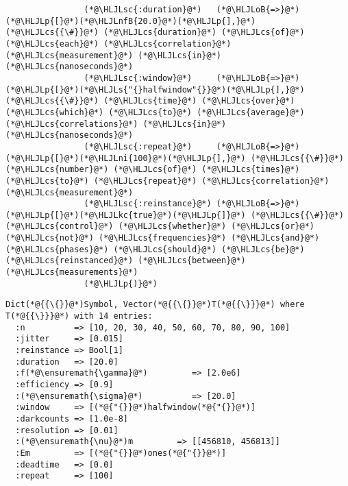 \documentclass[12pt,a4paper]{article}
\newcommand{\HLJLkc}[1]{\textcolor[RGB]{59,151,46}{\textit{#1}}}
\newcommand{\HLJLs}[1]{\textcolor[RGB]{201,61,57}{#1}}
\newcommand{\HLJLsc}[1]{\textcolor[RGB]{201,61,57}{#1}}
\newcommand{\HLJLnfB}[1]{\textcolor[RGB]{59,151,46}{#1}}
\newcommand{\HLJLni}[1]{\textcolor[RGB]{59,151,46}{#1}}
\newcommand{\HLJLoB}[1]{\textcolor[RGB]{102,102,102}{\textbf{#1}}}
\newcommand{\HLJLp}[1]{#1}
\newcommand{\HLJLcs}[1]{\textcolor[RGB]{153,153,119}{\textit{#1}}}
\begin{document}
\begin{lstlisting}
                (*@\HLJLsc{:duration}@*)   (*@\HLJLoB{=>}@*) (*@\HLJLp{[}@*)(*@\HLJLnfB{20.0}@*)(*@\HLJLp{],}@*) (*@\HLJLcs{{\#}}@*) (*@\HLJLcs{duration}@*) (*@\HLJLcs{of}@*) (*@\HLJLcs{each}@*) (*@\HLJLcs{correlation}@*) (*@\HLJLcs{measurement}@*) (*@\HLJLcs{in}@*) (*@\HLJLcs{nanoseconds}@*)
                (*@\HLJLsc{:window}@*)     (*@\HLJLoB{=>}@*) (*@\HLJLp{[}@*)(*@\HLJLs{"{}halfwindow"{}}@*)(*@\HLJLp{],}@*) (*@\HLJLcs{{\#}}@*) (*@\HLJLcs{time}@*) (*@\HLJLcs{over}@*) (*@\HLJLcs{which}@*) (*@\HLJLcs{to}@*) (*@\HLJLcs{average}@*) (*@\HLJLcs{correlations}@*) (*@\HLJLcs{in}@*) (*@\HLJLcs{nanoseconds}@*)
                (*@\HLJLsc{:repeat}@*)     (*@\HLJLoB{=>}@*) (*@\HLJLp{[}@*)(*@\HLJLni{100}@*)(*@\HLJLp{],}@*) (*@\HLJLcs{{\#}}@*) (*@\HLJLcs{number}@*) (*@\HLJLcs{of}@*) (*@\HLJLcs{times}@*) (*@\HLJLcs{to}@*) (*@\HLJLcs{repeat}@*) (*@\HLJLcs{correlation}@*) (*@\HLJLcs{measurement}@*)
                (*@\HLJLsc{:reinstance}@*) (*@\HLJLoB{=>}@*) (*@\HLJLp{[}@*)(*@\HLJLkc{true}@*)(*@\HLJLp{]}@*) (*@\HLJLcs{{\#}}@*) (*@\HLJLcs{control}@*) (*@\HLJLcs{whether}@*) (*@\HLJLcs{or}@*) (*@\HLJLcs{not}@*) (*@\HLJLcs{frequencies}@*) (*@\HLJLcs{and}@*) (*@\HLJLcs{phases}@*) (*@\HLJLcs{should}@*) (*@\HLJLcs{be}@*) (*@\HLJLcs{reinstanced}@*) (*@\HLJLcs{between}@*) (*@\HLJLcs{measurements}@*)
                (*@\HLJLp{)}@*)
\end{lstlisting}

\begin{lstlisting}
Dict(*@{{\{}}@*)Symbol, Vector(*@{{\{}}@*)T(*@{{\}}}@*) where T(*@{{\}}}@*) with 14 entries:
  :n          => [10, 20, 30, 40, 50, 60, 70, 80, 90, 100]
  :jitter     => [0.015]
  :reinstance => Bool[1]
  :duration   => [20.0]
  :f(*@\ensuremath{\gamma}@*)         => [2.0e6]
  :efficiency => [0.9]
  :(*@\ensuremath{\sigma}@*)          => [20.0]
  :window     => [(*@{"{}}@*)halfwindow(*@{"{}}@*)]
  :darkcounts => [1.0e-8]
  :resolution => [0.01]
  :(*@\ensuremath{\nu}@*)m         => [[456810, 456813]]
  :Em         => [(*@{"{}}@*)ones(*@{"{}}@*)]
  :deadtime   => [0.0]
  :repeat     => [100]
\end{lstlisting}
\end{document}
